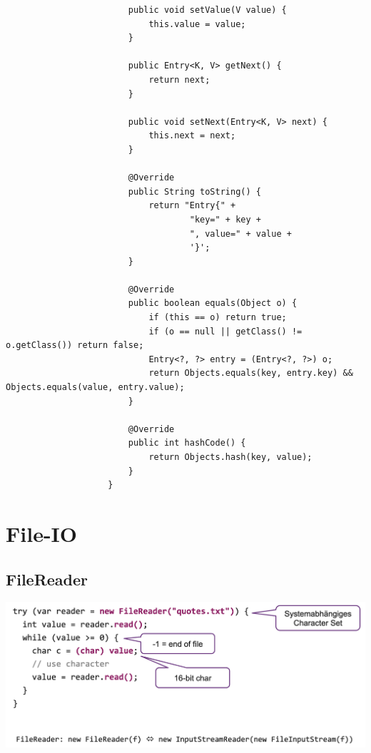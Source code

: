 \documentclass[a4paper, landscape, 8pt]{scrartcl}
\begin{document}
\begin{multicols*}{4}
\begin{lstlisting}
                        public void setValue(V value) {
                            this.value = value;
                        }

                        public Entry<K, V> getNext() {
                            return next;
                        }

                        public void setNext(Entry<K, V> next) {
                            this.next = next;
                        }

                        @Override
                        public String toString() {
                            return "Entry{" +
                                    "key=" + key +
                                    ", value=" + value +
                                    '}';
                        }

                        @Override
                        public boolean equals(Object o) {
                            if (this == o) return true;
                            if (o == null || getClass() != o.getClass()) return false;
                            Entry<?, ?> entry = (Entry<?, ?>) o;
                            return Objects.equals(key, entry.key) && Objects.equals(value, entry.value);
                        }

                        @Override
                        public int hashCode() {
                            return Objects.hash(key, value);
                        }
                    }
                    \end{lstlisting}

        \section{File-IO}
            \subsection{FileReader}
                \includegraphics[scale=0.15]{graphic/19_file_reader}

\end{multicols*}
\end{document}
